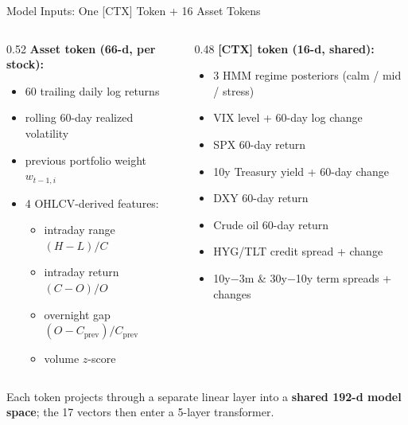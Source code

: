 \documentclass[10pt, aspectratio=169]{beamer}
\begin{document}
\begin{frame}{Model Inputs: One [CTX] Token + 16 Asset Tokens}
\begin{columns}[T,onlytextwidth]
\begin{column}{0.52\textwidth}
\textbf{Asset token (66-d, per stock):}
\begin{itemize}\setlength{\itemsep}{2pt}\footnotesize
  \item 60 trailing daily log returns
  \item rolling 60-day realized volatility
  \item previous portfolio weight $w_{t-1, i}$
  \item 4 OHLCV-derived features:
    \begin{itemize}\footnotesize
      \item intraday range $(H{-}L)/C$
      \item intraday return $(C{-}O)/O$
      \item overnight gap $(O{-}C_{\text{prev}})/C_{\text{prev}}$
      \item volume $z$-score
    \end{itemize}
\end{itemize}
\end{column}
\begin{column}{0.48\textwidth}
\textbf{[CTX] token (16-d, shared):}
\begin{itemize}\setlength{\itemsep}{2pt}\footnotesize
  \item 3 HMM regime posteriors (calm / mid / stress)
  \item VIX level + 60-day log change
  \item SPX 60-day return
  \item 10y Treasury yield + 60-day change
  \item DXY 60-day return
  \item Crude oil 60-day return
  \item HYG/TLT credit spread + change
  \item 10y$-$3m \& 30y$-$10y term spreads + changes
\end{itemize}
\end{column}
\end{columns}
\vspace{0.6em}
Each token projects through a separate linear layer into a \textbf{shared 192-d model space}; the 17 vectors then enter a 5-layer transformer.
\end{frame}
\end{document}
